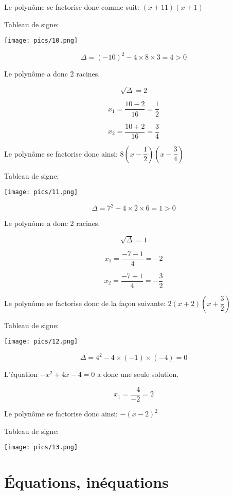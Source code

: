 \documentclass[a4paper,12pt]{scrartcl}
\begin{document}
Le polynôme se factorise donc comme suit: $\left(x + 11\right)\left(x + 1\right)$

Tableau de signe:

\texttt{[image: pics/10.png]}



$$\Delta = (-10)^2 - 4 \times 8 \times 3 = 4 > 0$$

Le polynôme a donc 2 racines.

$$\sqrt{\Delta} = 2$$

$$x_1 = \dfrac{10 - 2}{16} = \dfrac{1}{2}$$

$$x_2 = \dfrac{10 + 2}{16} = \dfrac{3}{4}$$

Le polynôme se factorise donc ainsi: $8\left(x - \dfrac{1}{2}\right)\left(x - \dfrac{3}{4}\right)$

Tableau de signe:

\texttt{[image: pics/11.png]}



$$\Delta = 7^2 - 4 \times 2 \times 6 = 1 > 0$$

Le polynôme a donc 2 racines.

$$\sqrt{\Delta} = 1$$

$$x_1 = \dfrac{-7 - 1}{4} = -2$$

$$x_2 = \dfrac{-7 + 1}{4} = -\dfrac{3}{2}$$

Le polynôme se factorise donc de la façon suivante: $2\left(x + 2\right)\left(x + \dfrac{3}{2}\right)$

Tableau de signe:

\texttt{[image: pics/12.png]}



$$\Delta = 4^2 - 4 \times (-1) \times (-4) = 0$$

L'équation $-x^2 + 4x - 4 = 0$ a donc une seule solution.

$$x_1 = \dfrac{-4}{-2} = 2$$

Le polynôme se factorise donc ainsi: $-\left(x - 2\right)^2$

Tableau de signe:

\texttt{[image: pics/13.png]}


\section*{Équations, inéquations}

\end{document}
